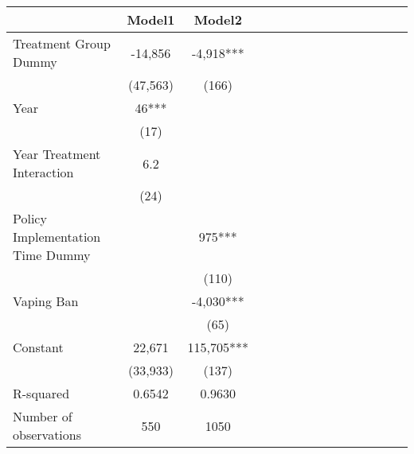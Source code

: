 \begin{tabular}{l*{14}{c}}
                    &      Model1   &      Model2   \\
\hline
Treatment Group Dummy&     -14,856   &      -4,918***\\
                    &    (47,563)   &       (166)   \\
Year                &          46***&               \\
                    &        (17)   &               \\
Year Treatment Interaction&         6.2   &               \\
                    &        (24)   &               \\
Policy Implementation Time Dummy&               &         975***\\
                    &               &       (110)   \\
Vaping Ban          &               &      -4,030***\\
                    &               &        (65)   \\
Constant            &      22,671   &     115,705***\\
                    &    (33,933)   &       (137)   \\
\hline
R-squared           &      0.6542   &      0.9630   \\
Number of observations&         550   &        1050   \\
\end{tabular}
